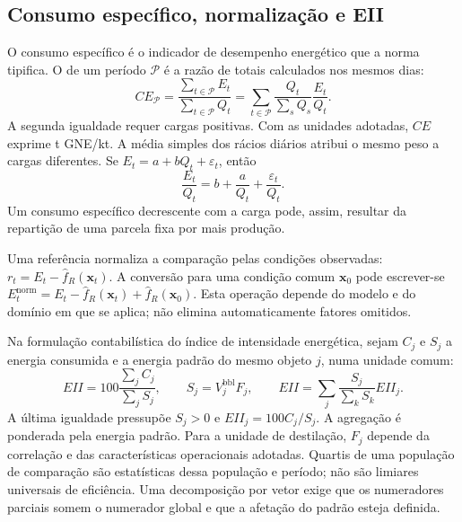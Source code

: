 \subsection{Consumo específico, normalização e EII}
\label{sec:mat-indicadores}
O consumo específico é o indicador de desempenho energético que a norma tipifica. O de um período $\mathcal P$ é a razão de totais calculados nos mesmos dias:
\begin{equation}
CE_{\mathcal P}=\frac{\sum_{t\in\mathcal P}E_t}{\sum_{t\in\mathcal P}Q_t}
=\sum_{t\in\mathcal P}\frac{Q_t}{\sum_sQ_s}\frac{E_t}{Q_t}.
\label{eq:mat-consumo-especifico}
\end{equation}
A segunda igualdade requer cargas positivas. Com as unidades adotadas, $CE$ exprime t GNE/kt. A média simples dos rácios diários atribui o mesmo peso a cargas diferentes. Se $E_t=a+bQ_t+\varepsilon_t$, então
\begin{equation}
\frac{E_t}{Q_t}=b+\frac{a}{Q_t}+\frac{\varepsilon_t}{Q_t}.
\label{eq:mat-racio-carga}
\end{equation}
Um consumo específico decrescente com a carga pode, assim, resultar da repartição de uma parcela fixa por mais produção.

Uma referência normaliza a comparação pelas condições observadas: $r_t=E_t-\widehat f_R(\boldsymbol x_t)$. A conversão para uma condição comum $\boldsymbol x_0$ pode escrever-se $E_t^{\mathrm{norm}}=E_t-\widehat f_R(\boldsymbol x_t)+\widehat f_R(\boldsymbol x_0)$. Esta operação depende do modelo e do domínio em que se aplica; não elimina automaticamente fatores omitidos.

Na formulação contabilística do índice de intensidade energética, sejam $C_j$ e $S_j$ a energia consumida e a energia padrão do mesmo objeto $j$, numa unidade comum:
\begin{equation}
EII=100\frac{\sum_jC_j}{\sum_jS_j},
\qquad S_j=V_j^{\mathrm{bbl}}F_j,
\qquad EII=\sum_j\frac{S_j}{\sum_kS_k}EII_j.
\label{eq:mat-eii}
\end{equation}
A última igualdade pressupõe $S_j>0$ e $EII_j=100C_j/S_j$. A agregação é ponderada pela energia padrão. Para a unidade de destilação, $F_j$ depende da correlação e das características operacionais adotadas. Quartis de uma população de comparação são estatísticas dessa população e período; não são limiares universais de eficiência. Uma decomposição por vetor exige que os numeradores parciais somem o numerador global e que a afetação do padrão esteja definida.

